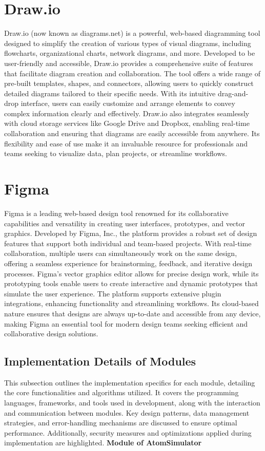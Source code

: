 \section*{Draw.io}
Draw.io (now known as diagrams.net) is a powerful, web-based diagramming tool designed to simplify the creation of various types of visual diagrams, including flowcharts, organizational charts, network diagrams, and more. Developed to be user-friendly and accessible, Draw.io provides a comprehensive suite of features that facilitate diagram creation and collaboration. The tool offers a wide range of pre-built templates, shapes, and connectors, allowing users to quickly construct detailed diagrams tailored to their specific needs. With its intuitive drag-and-drop interface, users can easily customize and arrange elements to convey complex information clearly and effectively. Draw.io also integrates seamlessly with cloud storage services like Google Drive and Dropbox, enabling real-time collaboration and ensuring that diagrams are easily accessible from anywhere. Its flexibility and ease of use make it an invaluable resource for professionals and teams seeking to visualize data, plan projects, or streamline workflows.
\section*{Figma}
Figma is a leading web-based design tool renowned for its collaborative capabilities and versatility in creating user interfaces, prototypes, and vector graphics. Developed by Figma, Inc., the platform provides a robust set of design features that support both individual and team-based projects. With real-time collaboration, multiple users can simultaneously work on the same design, offering a seamless experience for brainstorming, feedback, and iterative design processes. Figma’s vector graphics editor allows for precise design work, while its prototyping tools enable users to create interactive and dynamic prototypes that simulate the user experience. The platform supports extensive plugin integrations, enhancing functionality and streamlining workflows. Its cloud-based nature ensures that designs are always up-to-date and accessible from any device, making Figma an essential tool for modern design teams seeking efficient and collaborative design solutions.


\subsection{Implementation Details of Modules}
This subsection outlines the implementation specifics for each module, detailing the core functionalities and algorithms utilized. It covers the programming languages, frameworks, and tools used in development, along with the interaction and communication between modules. Key design patterns, data management strategies, and error-handling mechanisms are discussed to ensure optimal performance. Additionally, security measures and optimizations applied during implementation are highlighted.
\newline
\newpage
\textbf{Module of AtomSimulator}

